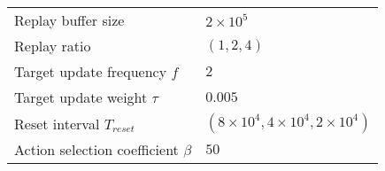 \documentclass[base]{subfiles}
\begin{document}
\begin{table}[h]
\begin{tabular}{l|l}
		Replay buffer size                             & $2 \times 10^5$                                 \\
		Replay ratio                                   & $(1,2,4)$                                       \\
		Target update frequency $f$                    & $2$                                             \\
		Target update weight $\tau$                    & $0.005$                                         \\
		Reset interval $T_{reset}$                     & $(8 \times 10^4, 4 \times 10^4, 2 \times 10^4)$ \\
		Action selection coefficient $\beta$           & $50$                                            \\
		\bottomrule
	\end{tabular}
\end{table}
\end{document}
